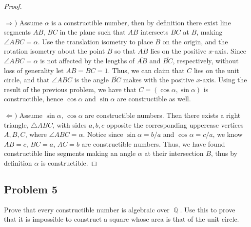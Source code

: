 \documentclass[letterpaper, 12pt]{amsart}
\DeclareMathOperator{\Q}{\mathbb{Q}}
\theoremstyle{definition}  %
\newcommand{\Ra}{\Rightarrow}                   %
\newcommand{\La}{\Leftarrow}                    %
\begin{document}
	\begin{proof} \

	$\Ra)$ Assume $\alpha$ is a constructible number, then by definition there exist line segments $\overline{AB}$, $\overline{BC}$ in the plane such that $\overline{AB}$ intersects $\overline{BC}$ at $B$, making $\angle ABC = \alpha$.
	Use the translation isometry to place $B$ on the origin, and the rotation isometry about the point $B$ so that $\overline{AB}$ lies on the positive $x$-axis.
	Since $\angle ABC = \alpha$ is not affected by the lengths of $\overline{AB}$ and $\overline{BC}$, respectively, without loss of generality let $AB = BC = 1$.
	Thus, we can claim that $C$ lies on the unit circle, and that $\angle ABC$ is the angle $\overline{BC}$ makes with the positive $x$-axis.
	Using the result of the previous problem, we have that $C = (\cos{\alpha}, \sin{\alpha})$ is constructible, hence $\cos{\alpha}$ and $\sin{\alpha}$ are constructible as well.

	$\La)$ Assume $\sin{\alpha}$, $\cos{\alpha}$ are constructible numbers.
	Then there exists a right triangle, $\triangle ABC$, with sides $a,b,c$ opposite the corresponding uppercase vertices $A,B,C$, where $\angle ABC = \alpha$.
	Notice since $\sin{\alpha} = b/a$ and $\cos{\alpha} = c/a$, we know $AB = c$, $BC = a$, $AC = b$ are constructible numbers.
	Thus, we have found constructible line segments making an angle $\alpha$ at their intersection $B$, thus by definition $\alpha$ is constructible. 
	\end{proof}

	\subsection*{Problem 5}
	\label{sub:problem_5}
	Prove that every constructible number is algebraic over $\Q$. 
	Use this to prove that it is impossible to construct a square whose area is that of the unit circle.
\end{document}
